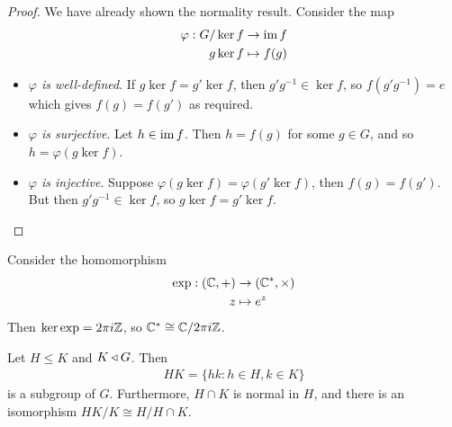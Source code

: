 \documentclass{../../template/note}
\begin{document}
    \begin{proof}
        We have already shown the normality result. Consider the map
        \begin{align*}
            \varphi: G/\ker f &\to \operatorname{im} f \\
            g\ker f &\mapsto f(g)
        \end{align*}
        \begin{itemize}
            \item \emph{$\varphi$ is well-defined}. If $g \ker f = g'\ker f$, then $g'g^{-1} \in \ker f$, so $f(g'g^{-1})= e$ which gives $f(g) = f(g')$ as required.
            \item \emph{$\varphi$ is surjective}. Let $h \in \operatorname{im} f$. Then $h = f(g)$ for some $g \in G$, and so $h = \varphi(g \ker f)$.
            \item \emph{$\varphi$ is injective}. Suppose $\varphi(g \ker f) = \varphi(g' \ker f)$, then $f(g) = f(g')$. But then $g'g^{-1} \in \ker f$, so $g \ker f = g' \ker f$.
        \end{itemize}
    \end{proof}
    
    \begin{example*}
        Consider the homomorphism
        \begin{align*}
            \exp: (\mathbb C, +) &\to (\mathbb C^*, \times) \\
            z &\mapsto e^z
        \end{align*}
        Then $\ker \exp = 2\pi i\mathbb Z$, so $\mathbb C^* \cong \mathbb C/2\pi i \mathbb Z$.
    \end{example*}
    
    \begin{theorem}
        Let $H \leq K$ and $K \triangleleft G$. Then
        \begin{align*}
            HK = \{hk : h \in H, k \in K\}
        \end{align*}
        is a subgroup of $G$. Furthermore, $H \cap K$ is normal in $H$, and there is an isomorphism $HK/K \cong H/H \cap K$.
    \end{theorem}
    
\end{document}

